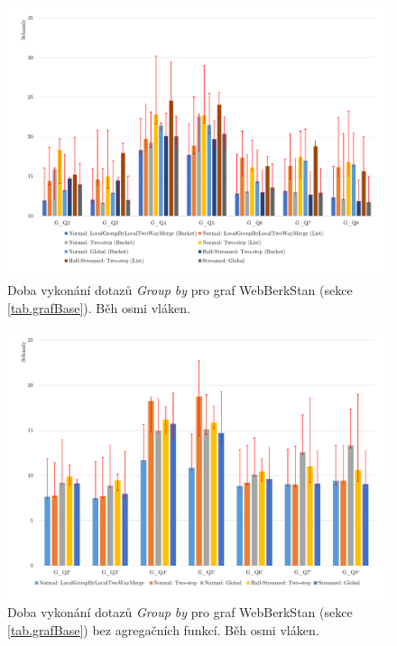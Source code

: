 \begin{figure}[!htp]
\includegraphics[width=\linewidth]{../img/webberkstanGroupByPar.pdf}\centering
\caption{Doba vykonání dotazů \textit{Group by} pro graf WebBerkStan (sekce \ref{tab.grafBase}). Běh osmi vláken.}
\label{figure.webberkstanGroupByPar}
\end{figure}
\begin{figure}[!htp]
\includegraphics[width=\linewidth]{../img/webberkstanGroupByParNoAgg.pdf}\centering
\caption{Doba vykonání dotazů \textit{Group by} pro graf WebBerkStan (sekce \ref{tab.grafBase}) bez agregačních funkcí. Běh osmi vláken.}
\label{figure.webberkstanGroupByParNoAgg}
\end{figure}

